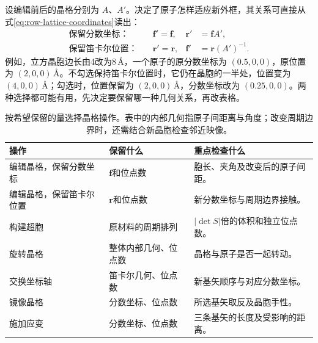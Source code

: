 设编辑前后的晶格分别为 $A$、$A'$。决定了原子怎样适应新外框，其关系可直接从式\eqref{eq:row-lattice-coordinates}读出：
\begin{equation}
 \begin{aligned}
 \text{保留分数坐标：}\quad&\mathbf f'=\mathbf f,
       &\mathbf r'&=\mathbf f A',\\
 \text{保留笛卡尔位置：}\quad&\mathbf r'=\mathbf r,
       &\mathbf f'&=\mathbf r(A')^{-1}.
 \end{aligned}
 \label{eq:lattice-preservation-options}
\end{equation}
例如，立方晶胞边长由4改为8\,\AA，一个原子的原分数坐标为 $(0.5,0,0)$，原位置为 $(2,0,0)\,\text{\AA}$。不勾选保持笛卡尔位置时，它仍在晶胞的一半处，位置变为 $(4,0,0)\,\text{\AA}$；勾选时，位置保留为 $(2,0,0)\,\text{\AA}$，分数坐标改为 $(0.25,0,0)$。两种选择都可能有用，先决定要保留哪一种几何关系，再改表格。

\begin{table}[!htb]
\centering\small
\begin{tabularx}{\linewidth}{p{30mm}XX}
\toprule
操作 & 保留什么 & 重点检查什么\\
\midrule
编辑晶格，保留分数坐标 & $\mathbf f$和位点数 & 胞长、夹角及改变后的原子间距。\\
编辑晶格，保留笛卡尔位置 & $\mathbf r$和位点数 & 新分数坐标与周期边界接触。\\
构建超胞 & 原材料的周期排列 & $|\det S|$倍的体积和独立位点数。\\
旋转晶格 & 整体内部几何、位点数 & 晶格与原子是否一起转动。\\
交换坐标轴 & 笛卡尔几何、位点数 & 新基矢顺序与对应分数坐标。\\
镜像晶格 & 分数坐标、位点数 & 所选基矢取反及晶胞手性。\\
施加应变 & 分数坐标、位点数 & 三条基矢的长度及受影响的距离。\\
\bottomrule
\end{tabularx}
\caption{按希望保留的量选择晶格操作。表中的内部几何指原子间距离与角度；改变周期边界时，还需结合新晶胞检查邻近映像。}
\label{tab:round10-lattice-invariants}
\end{table}
